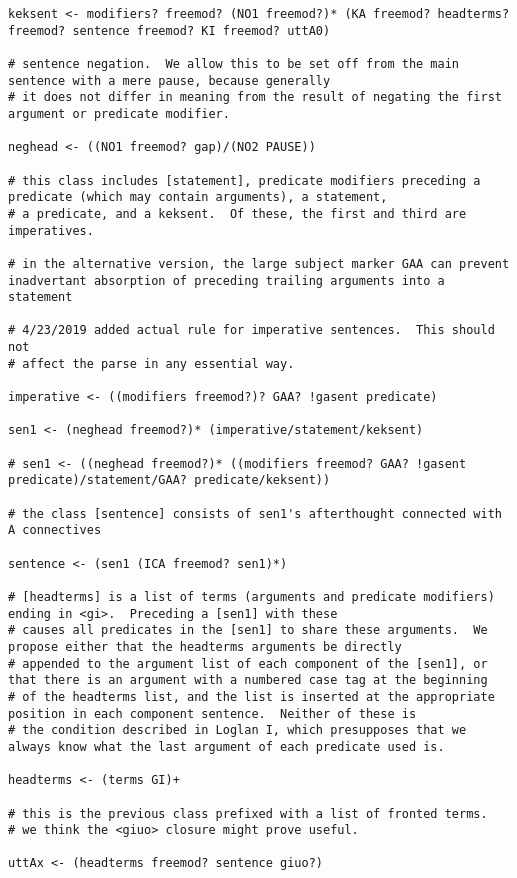 \documentclass{article}
\begin{document}
\begin{verbatim}
keksent <- modifiers? freemod? (NO1 freemod?)* (KA freemod? headterms? freemod? sentence freemod? KI freemod? uttA0)

# sentence negation.  We allow this to be set off from the main sentence with a mere pause, because generally
# it does not differ in meaning from the result of negating the first argument or predicate modifier.

neghead <- ((NO1 freemod? gap)/(NO2 PAUSE))

# this class includes [statement], predicate modifiers preceding a predicate (which may contain arguments), a statement,
# a predicate, and a keksent.  Of these, the first and third are imperatives.

# in the alternative version, the large subject marker GAA can prevent inadvertant absorption of preceding trailing arguments into a statement

# 4/23/2019 added actual rule for imperative sentences.  This should not
# affect the parse in any essential way.

imperative <- ((modifiers freemod?)? GAA? !gasent predicate)

sen1 <- (neghead freemod?)* (imperative/statement/keksent)

# sen1 <- ((neghead freemod?)* ((modifiers freemod? GAA? !gasent predicate)/statement/GAA? predicate/keksent))

# the class [sentence] consists of sen1's afterthought connected with A connectives

sentence <- (sen1 (ICA freemod? sen1)*)

# [headterms] is a list of terms (arguments and predicate modifiers) ending in <gi>.  Preceding a [sen1] with these
# causes all predicates in the [sen1] to share these arguments.  We propose either that the headterms arguments be directly
# appended to the argument list of each component of the [sen1], or that there is an argument with a numbered case tag at the beginning
# of the headterms list, and the list is inserted at the appropriate position in each component sentence.  Neither of these is
# the condition described in Loglan I, which presupposes that we always know what the last argument of each predicate used is.

headterms <- (terms GI)+

# this is the previous class prefixed with a list of fronted terms.
# we think the <giuo> closure might prove useful.

uttAx <- (headterms freemod? sentence giuo?)


\end{verbatim}
\end{document}
